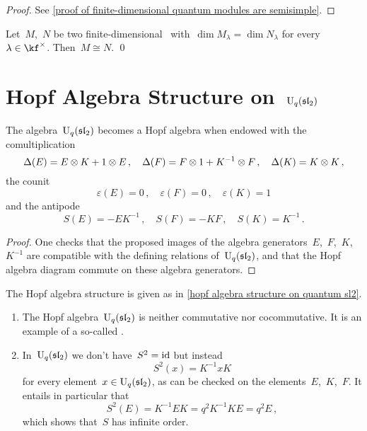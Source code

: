 \documentclass[a4paper, 11pt, oneside]{scrartcl}
\begin{document}
\begin{proof}[Proof]
  See \cref{proof of finite-dimensional quantum modules are semisimple}.
\end{proof}
  
\begin{corollary}
  \label{decomposition from quantum weight spaces}
  Let~$M$,~$N$ be two finite-dimensional~ with~$\dim M_\lambda = \dim N_\lambda$ for every~$\lambda \in \kf^\times$.
  Then~$M \cong N$.
  \qed
\end{corollary}





\section{Hopf Algebra Structure on~$\operatorname{U}_q(\mathfrak{sl}_2)$}


\begin{proposition}
  \label{hopf algebra structure on quantum sl2}
  The algebra~$\operatorname{U}_q(\mathfrak{sl}_2)$ becomes a Hopf algebra when endowed with the comultiplication
  \[
    \Delta(E) = E \otimes K + 1 \otimes E \,,
    \quad
    \Delta(F) = F \otimes 1 + K^{-1} \otimes F \,,
    \quad
    \Delta(K) = K \otimes K \,,
  \]
  the counit
  \[
    \varepsilon(E) = 0 \,,
    \quad
    \varepsilon(F) = 0 \,,
    \quad
    \varepsilon(K) = 1
  \]
  and the antipode
  \[
    S(E) = -E K^{-1} \,,
    \quad
    S(F) = -KF \,,
    \quad
    S(K) = K^{-1} \,.
  \]
\end{proposition}

\begin{proof}
  One checks that the proposed images of the algebra generators~$E$,~$F$,~$K$,~$K^{-1}$ are compatible with the defining relations of~$\operatorname{U}_q(\mathfrak{sl}_2)$, and that the Hopf algebra diagram commute on these algebra generators.
\end{proof}

\begin{definition}
  The Hopf algebra structure is given as in \cref{hopf algebra structure on quantum sl2}.
\end{definition}

\begin{remark}
  \leavevmode
  \begin{enumerate}
    \item
      The Hopf algebra~$\operatorname{U}_q(\mathfrak{sl}_2)$ is neither commutative nor cocommutative.
      It is an example of a so-called .
    \item
      In~$\operatorname{U}_q(\mathfrak{sl}_2)$ we don’t have~$S^2 = \mathrm{id}$ but instead
      \[
        S^2(x) = K^{-1} x K
      \]
      for every element~$x \in \operatorname{U}_q(\mathfrak{sl}_2)$, as can be checked on the elements~$E$,~$K$,~$F$.
      It entails in particular that
      \[
        S^2(E)
        =
        K^{-1} E K
        =
        q^2 K^{-1} K E
        =
        q^2 E \,,
      \]
      which shows that~$S$ has infinite order.
  \end{enumerate}
\end{remark}
\end{document}

